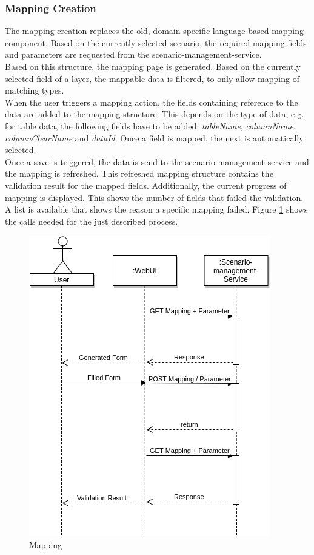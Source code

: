 \subsubsection{Mapping Creation}
The mapping creation replaces the old, domain-specific language based mapping component. Based on the currently selected scenario, the required mapping fields and parameters are requested from the scenario-management-service.\\
Based on this structure, the mapping page is generated. Based on the currently selected field of a layer, the mappable data is filtered, to only allow mapping of matching types.\\
When the user triggers a mapping action, the fields containing reference to the data are added to the mapping structure. This depends on the type of data, e.g. for table data, the following fields have to be added: \textit{tableName}, \textit{columnName}, \textit{columnClearName} and \textit{dataId}. Once a field is mapped, the next is automatically selected.\\
Once a save is triggered, the data is send to the scenario-management-service and the mapping is refreshed. This refreshed mapping structure contains the validation result for the mapped fields. Additionally, the current progress of mapping is displayed. This shows the number of fields that failed the validation. A list is available that shows the reason a specific mapping failed. Figure \ref{fig:mapping} shows the calls needed for the just described process.
\begin{figure}[H]
	\centering\includegraphics[width=.65\textwidth]{res/Mapping}
	\caption{Mapping}
	\label{fig:mapping}
\end{figure}



